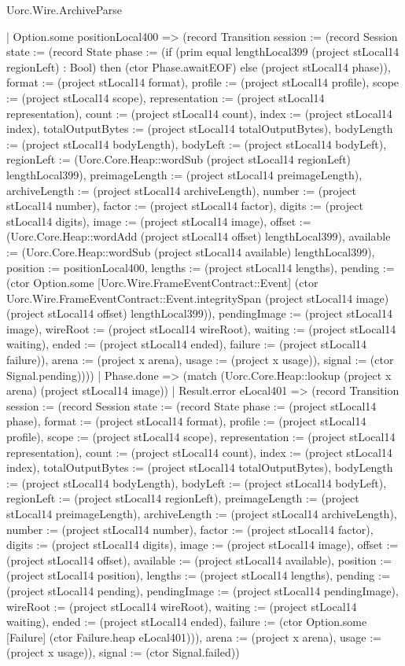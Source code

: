 \begin{lexlean}{Uorc.Wire.ArchiveParse}
\begin{semanticmodule}
{          | Option.some positionLocal400 => (record Transition {session := (record Session {state := (record State {phase := (if (prim equal lengthLocal399 (project stLocal14 regionLeft) : Bool) then (ctor Phase.awaitEOF) else (project stLocal14 phase)), format := (project stLocal14 format), profile := (project stLocal14 profile), scope := (project stLocal14 scope), representation := (project stLocal14 representation), count := (project stLocal14 count), index := (project stLocal14 index), totalOutputBytes := (project stLocal14 totalOutputBytes), bodyLength := (project stLocal14 bodyLength), bodyLeft := (project stLocal14 bodyLeft), regionLeft := (Uorc.Core.Heap::wordSub (project stLocal14 regionLeft) lengthLocal399), preimageLength := (project stLocal14 preimageLength), archiveLength := (project stLocal14 archiveLength), number := (project stLocal14 number), factor := (project stLocal14 factor), digits := (project stLocal14 digits), image := (project stLocal14 image), offset := (Uorc.Core.Heap::wordAdd (project stLocal14 offset) lengthLocal399), available := (Uorc.Core.Heap::wordSub (project stLocal14 available) lengthLocal399), position := positionLocal400, lengths := (project stLocal14 lengths), pending := (ctor Option.some [Uorc.Wire.FrameEventContract::Event] (ctor Uorc.Wire.FrameEventContract::Event.integritySpan (project stLocal14 image) (project stLocal14 offset) lengthLocal399)), pendingImage := (project stLocal14 image), wireRoot := (project stLocal14 wireRoot), waiting := (project stLocal14 waiting), ended := (project stLocal14 ended), failure := (project stLocal14 failure)}), arena := (project x arena), usage := (project x usage)}), signal := (ctor Signal.pending)})))
        | Phase.done => (match (Uorc.Core.Heap::lookup (project x arena) (project stLocal14 image))
          | Result.error eLocal401 => (record Transition {session := (record Session {state := (record State {phase := (project stLocal14 phase), format := (project stLocal14 format), profile := (project stLocal14 profile), scope := (project stLocal14 scope), representation := (project stLocal14 representation), count := (project stLocal14 count), index := (project stLocal14 index), totalOutputBytes := (project stLocal14 totalOutputBytes), bodyLength := (project stLocal14 bodyLength), bodyLeft := (project stLocal14 bodyLeft), regionLeft := (project stLocal14 regionLeft), preimageLength := (project stLocal14 preimageLength), archiveLength := (project stLocal14 archiveLength), number := (project stLocal14 number), factor := (project stLocal14 factor), digits := (project stLocal14 digits), image := (project stLocal14 image), offset := (project stLocal14 offset), available := (project stLocal14 available), position := (project stLocal14 position), lengths := (project stLocal14 lengths), pending := (project stLocal14 pending), pendingImage := (project stLocal14 pendingImage), wireRoot := (project stLocal14 wireRoot), waiting := (project stLocal14 waiting), ended := (project stLocal14 ended), failure := (ctor Option.some [Failure] (ctor Failure.heap eLocal401))}), arena := (project x arena), usage := (project x usage)}), signal := (ctor Signal.failed)})
}
\end{semanticmodule}
\end{lexlean}
